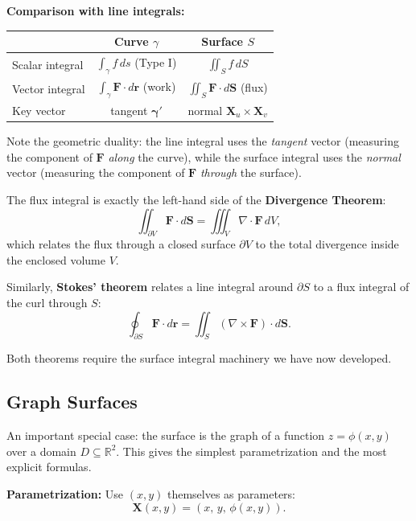 \documentclass[11pt]{report}
\newcommand{\R}{\mathbb{R}}
\begin{document}
\textbf{Comparison with line integrals:}
\begin{center}
\renewcommand{\arraystretch}{1.4}
\begin{tabular}{|l|c|c|}
\hline
& \textbf{Curve} $\gamma$ & \textbf{Surface} $S$ \\
\hline
Scalar integral & $\int_\gamma f \, ds$ (Type I) & $\iint_S f \, dS$ \\
\hline
Vector integral & $\int_\gamma \mathbf{F} \cdot d\mathbf{r}$ (work) & $\iint_S \mathbf{F} \cdot d\mathbf{S}$ (flux) \\
\hline
Key vector & tangent $\boldsymbol{\gamma}'$ & normal $\mathbf{X}_u \times \mathbf{X}_v$ \\
\hline
\end{tabular}
\end{center}

Note the geometric duality: the line integral uses the \textit{tangent} vector (measuring the component of $\mathbf{F}$ \textit{along} the curve), while the surface integral uses the \textit{normal} vector (measuring the component of $\mathbf{F}$ \textit{through} the surface).

\begin{remark}
The flux integral is exactly the left-hand side of the \textbf{Divergence Theorem}:
\[
\iint_{\partial V} \mathbf{F} \cdot d\mathbf{S} = \iiint_V \nabla \cdot \mathbf{F} \, dV,
\]
which relates the flux through a closed surface $\partial V$ to the total divergence inside the enclosed volume $V$.

Similarly, \textbf{Stokes' theorem} relates a line integral around $\partial S$ to a flux integral of the curl through $S$:
\[
\oint_{\partial S} \mathbf{F} \cdot d\mathbf{r} = \iint_S (\nabla \times \mathbf{F}) \cdot d\mathbf{S}.
\]

Both theorems require the surface integral machinery we have now developed.
\end{remark}

\subsection{Graph Surfaces}

An important special case: the surface is the graph of a function $z = \phi(x,y)$ over a domain $D \subseteq \R^2$. This gives the simplest parametrization and the most explicit formulas.

\textbf{Parametrization:} Use $(x,y)$ themselves as parameters:
\[
\mathbf{X}(x, y) = (x, \, y, \, \phi(x,y)).
\]
\end{document}
